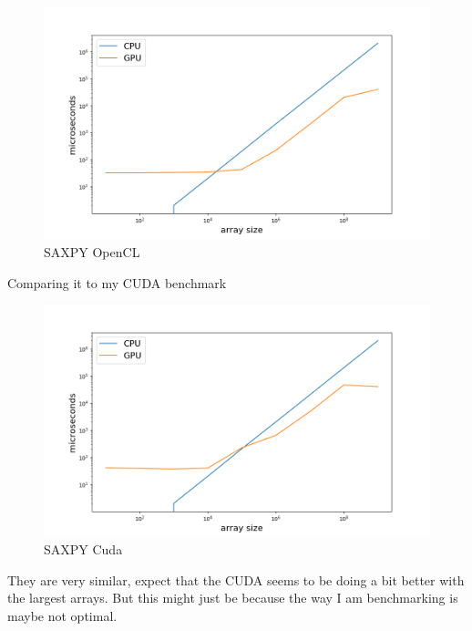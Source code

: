 \documentclass{article}
\begin{document}
\begin{figure}[H]
  \centering
  \includegraphics[width=0.95\linewidth]{ex_2/saxpy-cpu-vs-gpu.png}
  \caption{SAXPY OpenCL}
  \label{fig:}
\end{figure}

Comparing it to my CUDA benchmark

\begin{figure}[H]
  \centering
  \includegraphics[width=0.95\linewidth]{ex_2/saxpy-cpu-vs-gpu-cuda.png}
  \caption{SAXPY Cuda}
  \label{fig:}
\end{figure}

They are very similar, expect that the CUDA seems to be doing a bit better with the largest arrays. But this might just be because the way I am benchmarking is maybe not optimal.
\end{document}
